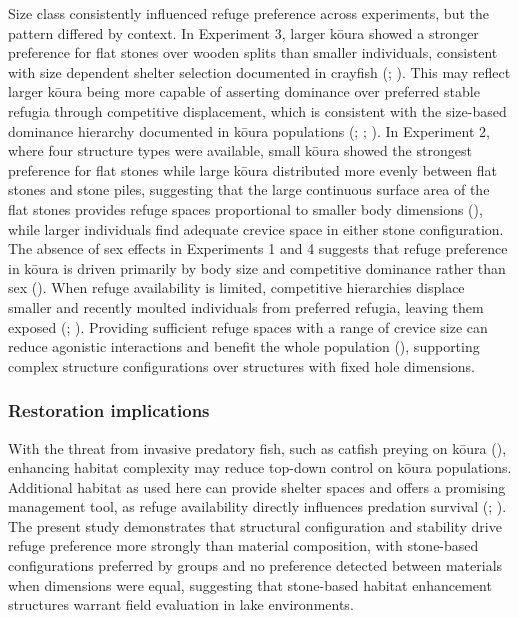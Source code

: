 \documentclass[
  letterpaper,
  DIV=11,
  numbers=noendperiod]{scrartcl}
\begin{document}
Size class consistently influenced refuge preference across experiments,
but the pattern differed by context. In Experiment 3, larger kōura
showed a stronger preference for flat stones over wooden splits than
smaller individuals, consistent with size dependent shelter selection
documented in crayfish (; ). This may
reflect larger kōura being more capable of asserting dominance over
preferred stable refugia through competitive displacement, which is
consistent with the size-based dominance hierarchy documented in kōura
populations (;
;
). In Experiment 2,
where four structure types were available, small kōura showed the
strongest preference for flat stones while large kōura distributed more
evenly between flat stones and stone piles, suggesting that the large
continuous surface area of the flat stones provides refuge spaces
proportional to smaller body dimensions
(), while larger
individuals find adequate crevice space in either stone configuration.
The absence of sex effects in Experiments 1 and 4 suggests that refuge
preference in kōura is driven primarily by body size and competitive
dominance rather than sex (). When refuge availability is limited, competitive
hierarchies displace smaller and recently moulted individuals from
preferred refugia, leaving them exposed (; ). Providing sufficient refuge spaces with a range of crevice size
can reduce agonistic interactions and benefit the whole population
(), supporting
complex structure configurations over structures with fixed hole
dimensions.

\subsubsection{Restoration implications}\label{restoration-implications}

With the threat from invasive predatory fish, such as catfish preying on
kōura (), enhancing
habitat complexity may reduce top-down control on kōura populations.
Additional habitat as used here can provide shelter spaces and offers a
promising management tool, as refuge availability directly influences
predation survival (;
). The present study
demonstrates that structural configuration and stability drive refuge
preference more strongly than material composition, with stone-based
configurations preferred by groups and no preference detected between
materials when dimensions were equal, suggesting that stone-based
habitat enhancement structures warrant field evaluation in lake
environments.
\end{document}
